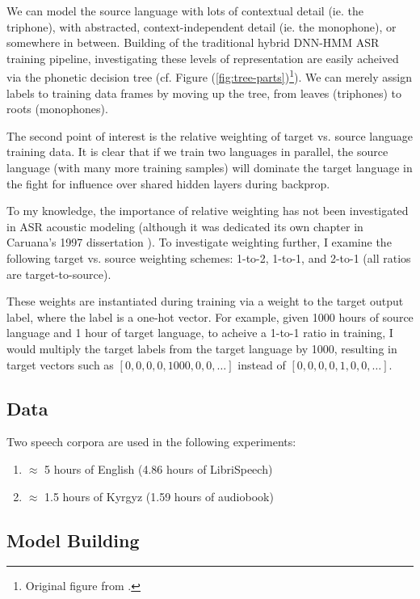 \documentclass[a4paper]{article}
\begin{document}
We can model the source language with lots of contextual detail (ie. the triphone), with abstracted, context-independent detail (ie. the monophone), or somewhere in between. Building of the traditional hybrid DNN-HMM ASR training pipeline, investigating these levels of representation are easily acheived via the phonetic decision tree (cf. Figure (\ref{fig:tree-parts})\footnote{Original figure from \cite{young2002}.}). We can merely assign labels to training data frames by moving up the tree, from leaves (triphones) to roots (monophones).

The second point of interest is the relative weighting of target vs. source language training data. It is clear that if we train two languages in parallel, the source language (with many more training samples) will dominate the target language in the fight for influence over shared hidden layers during backprop.

To my knowledge, the importance of relative weighting has not been investigated in ASR acoustic modeling (although it was dedicated its own chapter in Caruana's 1997 dissertation \cite{caruana1997}). To investigate weighting further, I examine the following target vs. source weighting schemes: 1-to-2, 1-to-1, and 2-to-1 (all ratios are target-to-source).

These weights are instantiated during training via a weight to the target output label, where the label is a one-hot vector. For example, given 1000 hours of source language and 1 hour of target language, to acheive a 1-to-1 ratio in training, I would multiply the target labels from the target language by 1000, resulting in target vectors such as \texttt{$[0, 0, 0, 0, 1000, 0, 0, \ldots]$} instead of \texttt{$[0, 0, 0, 0, 1, 0, 0, \ldots]$}.



\subsection{Data}

Two speech corpora are used in the following experiments:

\begin{enumerate}
\item $\approx$ 5 hours of English (4.86 hours of LibriSpeech)
\item $\approx$ 1.5 hours of Kyrgyz (1.59 hours of audiobook)
\end{enumerate}

\subsection{Model Building}
\end{document}
